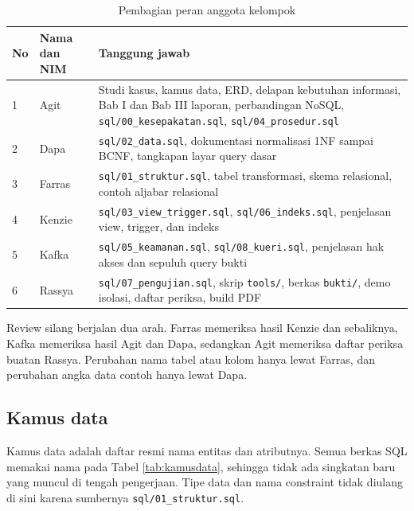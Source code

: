 \documentclass[12pt,a4paper]{article}
\begin{document}
\begin{table}[ht]
\centering
\caption{Pembagian peran anggota kelompok}
\small
\begin{tabularx}{\textwidth}{@{}p{0.8cm}p{3.4cm}X@{}}
\toprule
\textbf{No} & \textbf{Nama dan NIM} & \textbf{Tanggung jawab} \\
\midrule
1 & Agit & Studi kasus, kamus data, ERD, delapan kebutuhan informasi, Bab I dan Bab III laporan, perbandingan NoSQL, \texttt{sql/00\_kesepakatan.sql}, \texttt{sql/04\_prosedur.sql} \\
2 & Dapa & \texttt{sql/02\_data.sql}, dokumentasi normalisasi 1NF sampai BCNF, tangkapan layar query dasar \\
3 & Farras & \texttt{sql/01\_struktur.sql}, tabel transformasi, skema relasional, contoh aljabar relasional \\
4 & Kenzie & \texttt{sql/03\_view\_trigger.sql}, \texttt{sql/06\_indeks.sql}, penjelasan view, trigger, dan indeks \\
5 & Kafka & \texttt{sql/05\_keamanan.sql}, \texttt{sql/08\_kueri.sql}, penjelasan hak akses dan sepuluh query bukti \\
6 & Rassya & \texttt{sql/07\_pengujian.sql}, skrip \texttt{tools/}, berkas \texttt{bukti/}, demo isolasi, daftar periksa, build PDF \\
\bottomrule
\end{tabularx}
\end{table}

Review silang berjalan dua arah. Farras memeriksa hasil Kenzie dan sebaliknya,
Kafka memeriksa hasil Agit dan Dapa, sedangkan Agit memeriksa daftar periksa
buatan Rassya. Perubahan nama tabel atau kolom hanya lewat Farras, dan
perubahan angka data contoh hanya lewat Dapa.

\subsection{Kamus data}

Kamus data adalah daftar resmi nama entitas dan atributnya. Semua berkas SQL
memakai nama pada Tabel \ref{tab:kamusdata}, sehingga tidak ada singkatan baru
yang muncul di tengah pengerjaan. Tipe data dan nama constraint tidak diulang di
sini karena sumbernya \texttt{sql/01\_struktur.sql}.
\end{document}
